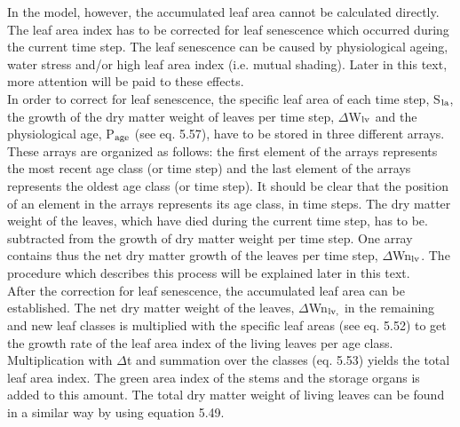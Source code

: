 In the model, however, the accumulated leaf area cannot be calculated directly. The leaf
area index has to be corrected for leaf senescence which occurred during the current time
step. The leaf senescence can be caused by physiologi\-cal ageing, water stress and/or high
leaf area index (i.e. mutual shading). Later in this text, more attention will be paid to
these effects.\\
In order to correct for leaf senescence, the specific leaf area of each time step, S$_{{\rm la}}$, the
growth of the dry matter weight of leaves per time step, $\Delta$W$_{{\rm lv}}$ and the physiological age,
P$_{{\rm age}}$ (see eq. 5.57), have to be stored in three different arrays. These arrays are organized
as follows: the first element of the arrays represents the most recent age class (or time
step) and the last element of the arrays represents the oldest age class (or time step). It
should be clear that the position of an element in the arrays represents its age class, in
time steps. The dry matter weight of the leaves, which have died during the current time
step, has to be. subtract\-ed from the growth of dry matter weight per time step. One array
contains thus the net dry matter growth of the leaves per time step, $\Delta$Wn$_{{\rm lv}}$. The procedure
which describes this process will be explained later in this text. \\
After the correction for leaf senescence, the accumulat\-ed leaf area can be established. The
net dry matter weight of the leaves, $\Delta$Wn$_{{\rm lv,}}$  in the remaining and new leaf classes is
multiplied with the specific leaf areas (see eq. 5.52) to get the growth rate of the leaf area
index of the living leaves per age class. Multiplication with $\Delta$t and summa\-tion over the
classes (eq. 5.53) yields the total leaf area index. The green area index of the stems and
the storage organs is added to this amount. The total dry matter weight of living leaves
can be found in a similar way by using equation 5.49. \\
\begin{figure}[htbp]
\begin{forcewidth}{10.05cm}
 \begin{center} \end{center}
\end{forcewidth}
\end{figure}










